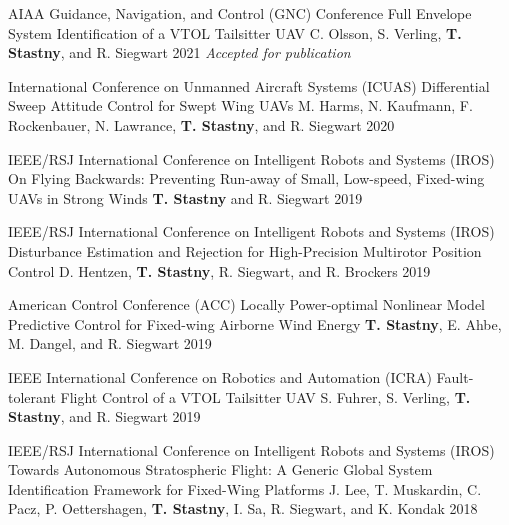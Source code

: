 \begin{cventries}
\begin{flushleft}
\end{flushleft}

\cvpubentry
	{AIAA Guidance, Navigation, and Control (GNC) Conference} %
	{Full Envelope System Identification of a VTOL Tailsitter UAV} %
	{C. Olsson, S. Verling, \textbf{T. Stastny}, and R. Siegwart} %
	{} %
	{2021} %
	{} %
	{\textit{Accepted for publication}} %

\cvpubentry
	{International Conference on Unmanned Aircraft Systems (ICUAS)} %
	{Differential Sweep Attitude Control for Swept Wing UAVs} %
	{M. Harms, N. Kaufmann, F. Rockenbauer, N. Lawrance, \textbf{T. Stastny}, and R. Siegwart} %
	{} %
	{2020} %
	{} %
	{} %
	
\cvpubentry
	{IEEE/RSJ International Conference on Intelligent Robots and Systems (IROS)} %
	{On Flying Backwards: Preventing Run-away of Small, Low-speed, Fixed-wing UAVs in Strong Winds} %
	{\textbf{T. Stastny} and R. Siegwart} %
	{} %
	{2019} %
	{} %
	{} %

\cvpubentry
	{IEEE/RSJ International Conference on Intelligent Robots and Systems (IROS)} %
	{Disturbance Estimation and Rejection for High-Precision Multirotor Position Control} %
	{D. Hentzen, \textbf{T. Stastny}, R. Siegwart, and R. Brockers} %
	{} %
	{2019} %
	{} %
	{} %

\cvpubentry
	{American Control Conference (ACC)} %
	{Locally Power-optimal Nonlinear Model Predictive Control for Fixed-wing Airborne Wind Energy} %
	{\textbf{T. Stastny}, E. Ahbe, M. Dangel, and R. Siegwart} %
	{} %
	{2019} %
	{} %
	{} %

\cvpubentry
	{IEEE International Conference on Robotics and Automation (ICRA)} %
	{Fault-tolerant Flight Control of a VTOL Tailsitter UAV} %
	{S. Fuhrer, S. Verling, \textbf{T. Stastny}, and R. Siegwart} %
	{} %
	{2019} %
	{} %
	{} %

\cvpubentry
	{IEEE/RSJ International Conference on Intelligent Robots and Systems (IROS)} %
	{Towards Autonomous Stratospheric Flight: A Generic Global System Identification Framework for Fixed-Wing Platforms} %
	{J. Lee, T. Muskardin, C. Pacz, P. Oettershagen, \textbf{T. Stastny}, I. Sa, R. Siegwart, and K. Kondak} %
	{} %
	{2018} %
	{} %
	{} %


\end{cventries}
